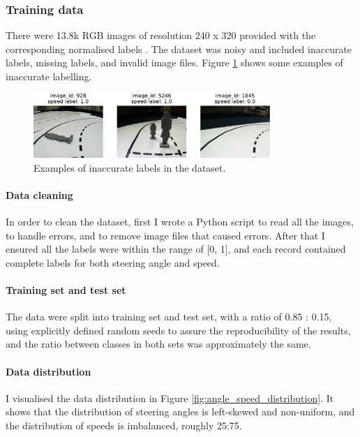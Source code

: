 \documentclass{article}
\begin{document}
\subsubsection{Training data}

There were 13.8k RGB images of resolution 240 x 320 provided with the corresponding normalised labels \citep{Kaggle}. The dataset was noisy and included inaccurate labels, missing labels, and invalid image files. Figure \ref{fig:inaccurate_label} shows some examples of inaccurate labelling.

\begin{figure}[h]
  \centering
  \includegraphics[width=0.8\textwidth]{figures/inaccurate_label.pdf}
  \caption{Examples of inaccurate labels in the dataset.}
  \label{fig:inaccurate_label}
\end{figure}

\paragraph{Data cleaning}
In order to clean the dataset, first I wrote a Python script to read all the images, to handle errors, and to remove image files that caused errors. After that I ensured all the labels were within the range of [0, 1], and each record contained complete labels for both steering angle and speed.

\paragraph{Training set and test set}
\label{sec:train_test_split}
The data were split into training set and test set, with a ratio of 0.85 : 0.15, using explicitly defined random seeds to assure the reproducibility of the results, and the ratio between classes in both sets was approximately the same.

\paragraph{Data distribution}
I visualised the data distribution in Figure \ref{fig:angle_speed_distribution}. It shows that the distribution of steering angles is left-skewed and non-uniform, and the distribution of speeds is imbalanced, roughly 25:75.
\end{document}
